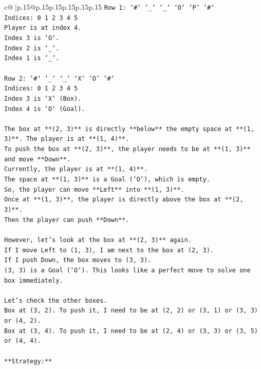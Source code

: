 \documentclass{article}
\begin{document}
{\begin{supertabular}{c@{$\;$}|p{.15\linewidth}@{}p{.15\linewidth}p{.15\linewidth}p{.15\linewidth}p{.15\linewidth}p{.15\linewidth}}
{{{\texttt{Row 1: `\#` `\_` `\_` `O` `P` `\#`} \\
\texttt{Indices: 0 1 2 3 4 5} \\
\texttt{Player is at index 4.} \\
\texttt{Index 3 is `O`.} \\
\texttt{Index 2 is `\_`.} \\
\texttt{Index 1 is `\_`.} \\
\\ 
\texttt{Row 2: `\#` `\_` `\_` `X` `O` `\#`} \\
\texttt{Indices: 0 1 2 3 4 5} \\
\texttt{Index 3 is `X` (Box).} \\
\texttt{Index 4 is `O` (Goal).} \\
\\ 
\texttt{The box at **(2, 3)** is directly **below** the empty space at **(1, 3)**. The player is at **(1, 4)**.} \\
\texttt{To push the box at **(2, 3)**, the player needs to be at **(1, 3)** and move **Down**.} \\
\texttt{Currently, the player is at **(1, 4)**.} \\
\texttt{The space at **(1, 3)** is a Goal (`O`), which is empty.} \\
\texttt{So, the player can move **Left** into **(1, 3)**.} \\
\texttt{Once at **(1, 3)**, the player is directly above the box at **(2, 3)**.} \\
\texttt{Then the player can push **Down**.} \\
\\ 
\texttt{However, let's look at the box at **(2, 3)** again.} \\
\texttt{If I move Left to (1, 3), I am next to the box at (2, 3).} \\
\texttt{If I push Down, the box moves to (3, 3).} \\
\texttt{(3, 3) is a Goal (`O`). This looks like a perfect move to solve one box immediately.} \\
\\ 
\texttt{Let's check the other boxes.} \\
\texttt{Box at (3, 2). To push it, I need to be at (2, 2) or (3, 1) or (3, 3) or (4, 2).} \\
\texttt{Box at (3, 4). To push it, I need to be at (2, 4) or (3, 3) or (3, 5) or (4, 4).} \\
\\ 
\texttt{**Strategy:**} \\
}}}
\end{supertabular}}
\end{document}
